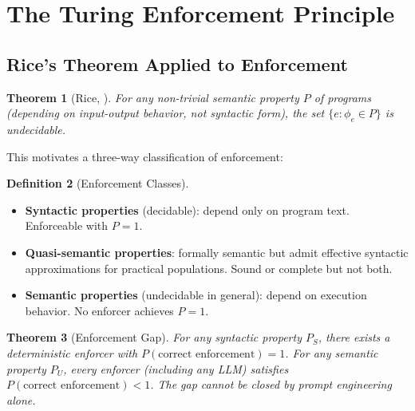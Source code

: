 \documentclass[11pt, a4paper]{article}
\newtheorem{theorem}{Theorem}[section]
\theoremstyle{definition}
\newtheorem{definition}[theorem]{Definition}
\theoremstyle{remark}
\begin{document}
\section{The Turing Enforcement Principle}
\label{sec:turing}

\subsection{Rice's Theorem Applied to Enforcement}

\begin{theorem}[Rice, \citeyear{rice1953}]
For any non-trivial semantic property $P$ of programs (depending on input-output behavior, not syntactic form), the set $\{e : \phi_e \in P\}$ is undecidable.
\end{theorem}

This motivates a three-way classification of enforcement:

\begin{definition}[Enforcement Classes]
~
\begin{itemize}[leftmargin=2em]
\item \textbf{Syntactic properties} (decidable): depend only on program text. Enforceable with $P = 1$.
\item \textbf{Quasi-semantic properties}: formally semantic but admit effective syntactic approximations for practical populations. Sound or complete but not both.
\item \textbf{Semantic properties} (undecidable in general): depend on execution behavior. No enforcer achieves $P = 1$.
\end{itemize}
\end{definition}

\begin{theorem}[Enforcement Gap]
\label{thm:gap}
For any syntactic property $P_S$, there exists a deterministic enforcer with $P(\text{correct enforcement}) = 1$. For any semantic property $P_U$, every enforcer (including any LLM) satisfies $P(\text{correct enforcement}) < 1$. The gap cannot be closed by prompt engineering alone.
\end{theorem}
\end{document}
